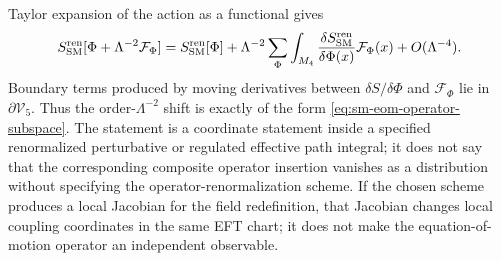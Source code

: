 Taylor expansion of the action as a functional gives
\[
  S_{\rm SM}^{\rm ren}[\Phi+\Lambda^{-2}\mathcal F_\Phi]
  =
  S_{\rm SM}^{\rm ren}[\Phi]
  +
  \Lambda^{-2}
  \sum_\Phi\int_{M_4}
  \frac{\delta S_{\rm SM}^{\rm ren}}{\delta\Phi(x)}
  \mathcal F_\Phi(x)
  +O(\Lambda^{-4}).
\]
Boundary terms produced by moving derivatives between
\(\delta S/\delta\Phi\) and \(\mathcal F_\Phi\) lie in
\(\partial\mathcal V_5\).  Thus the order-\(\Lambda^{-2}\) shift is exactly
of the form \eqref{eq:sm-eom-operator-subspace}.  The statement is a
coordinate statement inside a specified renormalized perturbative or regulated
effective path integral; it does not say that the corresponding composite
operator insertion vanishes as a distribution without specifying the
operator-renormalization scheme.  If the chosen scheme produces a local
Jacobian for the field redefinition, that Jacobian changes local coupling
coordinates in the same EFT chart; it does not make the equation-of-motion
operator an independent observable.

